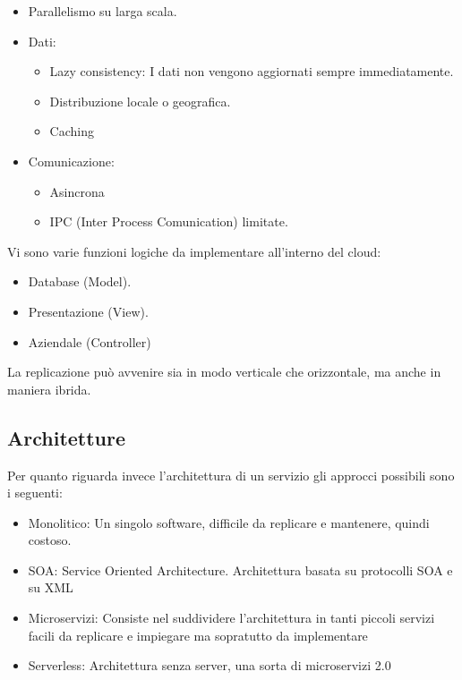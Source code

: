 \documentclass{article}
\begin{document}
		\begin{itemize}
		    \item Parallelismo su larga scala.
		    \item Dati:
		    \begin{itemize}
		        \item Lazy consistency: I dati non vengono aggiornati sempre immediatamente.
		        \item Distribuzione locale o geografica.
		        \item Caching
		    \end{itemize}
		    \item Comunicazione:
		    \begin{itemize}
		        \item Asincrona
		        \item IPC (Inter Process Comunication) limitate.
		    \end{itemize}
		\end{itemize}
		
		Vi sono varie funzioni logiche da implementare all'interno del cloud:
		\begin{itemize}
		    \item Database (Model).
		    \item Presentazione (View).
		    \item Aziendale (Controller)
		\end{itemize}
		La replicazione può avvenire sia in modo verticale che orizzontale, ma anche in maniera ibrida. 
		
		\subsection{Architetture}
		Per quanto riguarda invece l'architettura di un servizio gli approcci possibili sono i seguenti:
		\begin{itemize}
		    \item Monolitico: Un singolo software, difficile da replicare e mantenere, quindi costoso. 
		    \item SOA: Service Oriented Architecture. Architettura basata su protocolli SOA e su XML
		    \item Microservizi: Consiste nel suddividere l'architettura in tanti piccoli servizi facili da replicare e impiegare ma sopratutto da implementare
		    \item Serverless: Architettura senza server, una sorta di microservizi 2.0
		\end{itemize}
		
\end{document}
